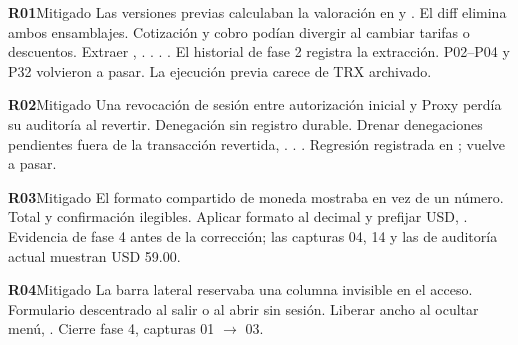 \par\medskip\noindent\begin{minipage}{\linewidth}\noindent\textbf{R01}\quad\textsf{Mitigado}
 Las versiones previas calculaban la valoración en  y . El diff elimina ambos ensamblajes.
 Cotización y cobro podían divergir al cambiar tarifas o descuentos.
 Extraer , .
 . . . 
 El historial de fase 2 registra la extracción. P02–P04 y P32 volvieron a pasar. La ejecución previa carece de TRX archivado.
\end{minipage}\par
\par\medskip\noindent\begin{minipage}{\linewidth}\noindent\textbf{R02}\quad\textsf{Mitigado}
 Una revocación de sesión entre autorización inicial y Proxy perdía su auditoría al revertir.
 Denegación sin registro durable.
 Drenar denegaciones pendientes fuera de la transacción revertida, .
 . . 
 Regresión registrada en ;  vuelve a pasar.
\end{minipage}\par
\par\medskip\noindent\begin{minipage}{\linewidth}\noindent\textbf{R03}\quad\textsf{Mitigado}
 El formato compartido de moneda mostraba  en vez de un número.
 Total y confirmación ilegibles.
 Aplicar formato  al decimal y prefijar USD, .
 
 Evidencia de fase 4 antes de la corrección; las capturas 04, 14 y las de auditoría actual muestran USD 59.00.
\end{minipage}\par
\par\medskip\noindent\begin{minipage}{\linewidth}\noindent\textbf{R04}\quad\textsf{Mitigado}
 La barra lateral reservaba una columna invisible en el acceso.
 Formulario descentrado al salir o al abrir sin sesión.
 Liberar ancho al ocultar menú, .
 
 Cierre fase 4, capturas 01 $\to$ 03.
\end{minipage}\par
